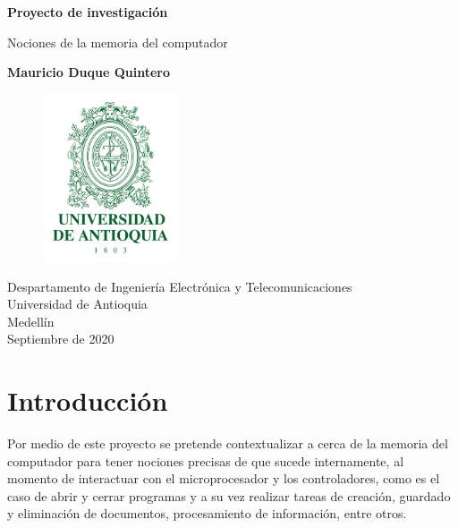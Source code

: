 \documentclass{article}
\begin{document}
\begin{titlepage}
    \begin{center}
        \vspace*{1cm}
            
        \Huge
        \textbf{Proyecto de investigación }
            
        \vspace{0.5cm}
        \LARGE
        Nociones de la memoria del computador
            
        \vspace{2.5cm}
            
        \textbf{Mauricio Duque Quintero }
            
        \vfill
        \begin{figure}[h]
        \includegraphics[width=4cm]{Escudo-UdeA.png}
        \centering
        \label{fig:descarga}
        \end{figure}
     
        \vspace{0.8cm}
            
        \Large
        Despartamento de Ingeniería Electrónica y Telecomunicaciones\\
        Universidad de Antioquia\\
        Medellín\\
        Septiembre de 2020
            
    \end{center}
\end{titlepage}

\tableofcontents

\section{Introducción}

Por medio de este proyecto se pretende contextualizar a cerca de la memoria del computador para tener nociones precisas de que sucede internamente, al momento de interactuar con el microprocesador y los controladores, como es el caso de abrir y cerrar programas y a su vez  realizar tareas de creación, guardado y eliminación de documentos, procesamiento de información, entre otros. 
\end{document}
